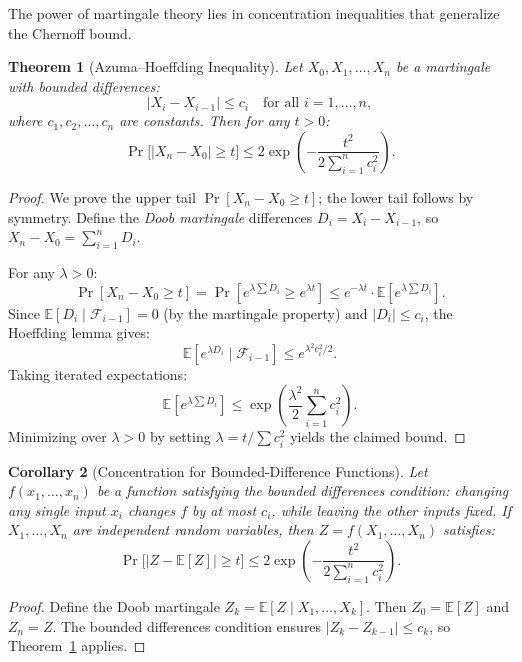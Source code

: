 \documentclass[twoside,12pt]{book}
\theoremstyle{plain}
\newtheorem{theorem}{Theorem}[chapter]
\newtheorem{corollary}[theorem]{Corollary}
\theoremstyle{definition}
\theoremstyle{remark}
\begin{document}
The power of martingale theory lies in concentration inequalities that
generalize the Chernoff bound.

\begin{theorem}[Azuma--Hoeffding Inequality]
\label{thm:azuma}
Let $X_0, X_1, \ldots, X_n$ be a martingale with bounded differences:
\[
|X_i - X_{i-1}| \leq c_i \quad \text{for all } i = 1, \ldots, n,
\]
where $c_1, c_2, \ldots, c_n$ are constants. Then for any $t > 0$:
\[
\Pr\!\bigl[|X_n - X_0| \geq t\bigr]
\leq 2\exp\!\left(-\frac{t^2}{2\sum_{i=1}^{n} c_i^2}\right).
\]
\end{theorem}

\begin{proof}
We prove the upper tail $\Pr[X_n - X_0 \geq t]$; the lower tail follows
by symmetry. Define the \emph{Doob martingale} differences $D_i = X_i -
X_{i-1}$, so $X_n - X_0 = \sum_{i=1}^{n} D_i$.

For any $\lambda > 0$:
\[
\Pr[X_n - X_0 \geq t] = \Pr\!\left[e^{\lambda \sum D_i}
\geq e^{\lambda t}\right]
\leq e^{-\lambda t} \cdot \mathbb{E}\!\left[e^{\lambda \sum D_i}\right].
\]
Since $\mathbb{E}[D_i \mid \mathcal{F}_{i-1}] = 0$ (by the martingale
property) and $|D_i| \leq c_i$, the Hoeffding lemma gives:
\[
\mathbb{E}\!\left[e^{\lambda D_i} \mid \mathcal{F}_{i-1}\right]
\leq e^{\lambda^2 c_i^2 / 2}.
\]
Taking iterated expectations:
\[
\mathbb{E}\!\left[e^{\lambda \sum D_i}\right]
\leq \exp\!\left(\frac{\lambda^2}{2}\sum_{i=1}^{n} c_i^2\right).
\]
Minimizing over $\lambda > 0$ by setting $\lambda = t / \sum c_i^2$
yields the claimed bound.
\end{proof}

\begin{corollary}[Concentration for Bounded-Difference Functions]
\label{cor:bounded-diff}
Let $f(x_1, \ldots, x_n)$ be a function satisfying the
\emph{bounded differences} condition: changing any single input $x_i$
changes $f$ by at most $c_i$, while leaving the other inputs fixed.
If $X_1, \ldots, X_n$ are independent random variables, then
$Z = f(X_1, \ldots, X_n)$ satisfies:
\[
\Pr\!\bigl[|Z - \mathbb{E}[Z]| \geq t\bigr]
\leq 2\exp\!\left(-\frac{t^2}{2\sum_{i=1}^{n} c_i^2}\right).
\]
\end{corollary}

\begin{proof}
Define the Doob martingale $Z_k = \mathbb{E}[Z \mid X_1, \ldots, X_k]$.
Then $Z_0 = \mathbb{E}[Z]$ and $Z_n = Z$. The bounded differences
condition ensures $|Z_k - Z_{k-1}| \leq c_k$, so Theorem~\ref{thm:azuma}
applies.
\end{proof}
\end{document}
